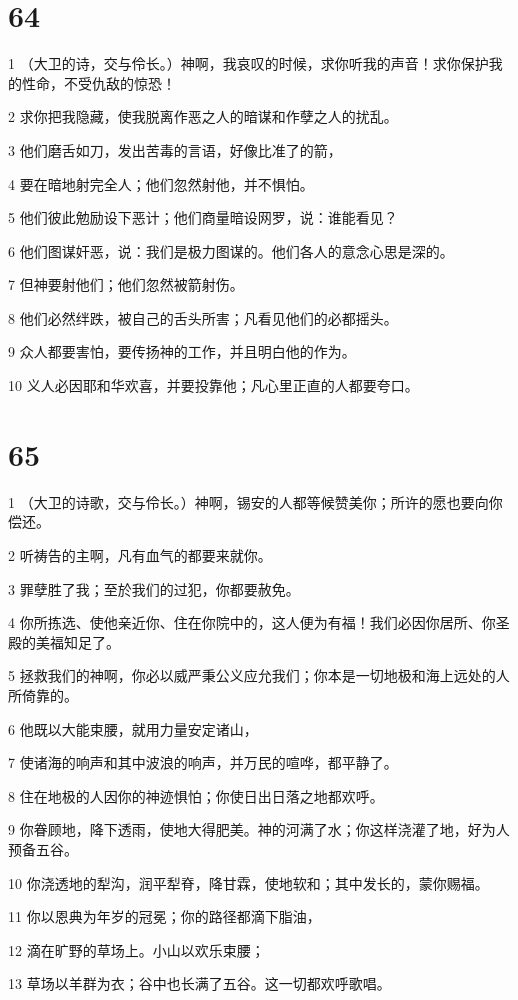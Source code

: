 \chapter{64}

\par 1 （大卫的诗，交与伶长。）神啊，我哀叹的时候，求你听我的声音！求你保护我的性命，不受仇敌的惊恐！
\par 2 求你把我隐藏，使我脱离作恶之人的暗谋和作孽之人的扰乱。
\par 3 他们磨舌如刀，发出苦毒的言语，好像比准了的箭，
\par 4 要在暗地射完全人；他们忽然射他，并不惧怕。
\par 5 他们彼此勉励设下恶计；他们商量暗设网罗，说：谁能看见？
\par 6 他们图谋奸恶，说：我们是极力图谋的。他们各人的意念心思是深的。
\par 7 但神要射他们；他们忽然被箭射伤。
\par 8 他们必然绊跌，被自己的舌头所害；凡看见他们的必都摇头。
\par 9 众人都要害怕，要传扬神的工作，并且明白他的作为。
\par 10 义人必因耶和华欢喜，并要投靠他；凡心里正直的人都要夸口。

\chapter{65}

\par 1 （大卫的诗歌，交与伶长。）神啊，锡安的人都等候赞美你；所许的愿也要向你偿还。
\par 2 听祷告的主啊，凡有血气的都要来就你。
\par 3 罪孽胜了我；至於我们的过犯，你都要赦免。
\par 4 你所拣选、使他亲近你、住在你院中的，这人便为有福！我们必因你居所、你圣殿的美福知足了。
\par 5 拯救我们的神啊，你必以威严秉公义应允我们；你本是一切地极和海上远处的人所倚靠的。
\par 6 他既以大能束腰，就用力量安定诸山，
\par 7 使诸海的响声和其中波浪的响声，并万民的喧哗，都平静了。
\par 8 住在地极的人因你的神迹惧怕；你使日出日落之地都欢呼。
\par 9 你眷顾地，降下透雨，使地大得肥美。神的河满了水；你这样浇灌了地，好为人预备五谷。
\par 10 你浇透地的犁沟，润平犁脊，降甘霖，使地软和；其中发长的，蒙你赐福。
\par 11 你以恩典为年岁的冠冕；你的路径都滴下脂油，
\par 12 滴在旷野的草场上。小山以欢乐束腰；
\par 13 草场以羊群为衣；谷中也长满了五谷。这一切都欢呼歌唱。

